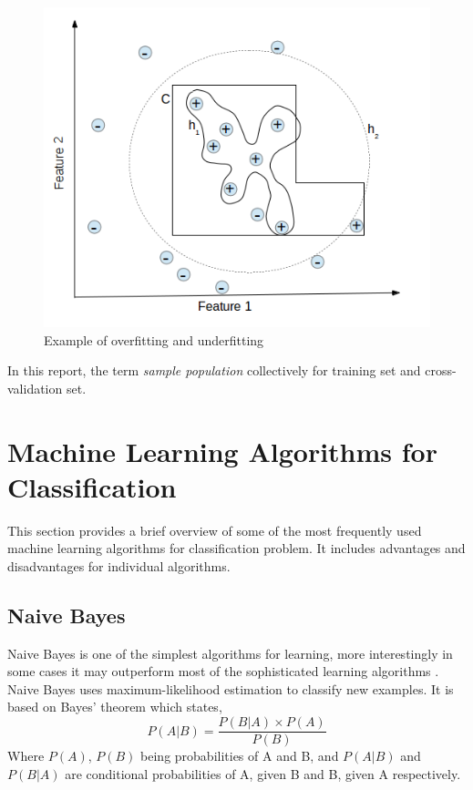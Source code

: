 \begin{figure}[h]
  \begin{center}
    \captionsetup{justification=centering}
    \includegraphics[scale=0.45]{figures/mlfitting.png}
    \caption{Example of overfitting and underfitting}
    \label{fig:mlfitting}
  \end{center}
\end{figure}
In this report, the term \emph{sample population} collectively for training set and cross-validation set.

\section{Machine Learning Algorithms for Classification}
\label{sec:c3mlclassification}
This section provides a brief overview of some of the most frequently used machine learning algorithms for classification problem. It includes advantages and disadvantages for individual algorithms.

\subsection{Naive Bayes}
Naive Bayes is one of the simplest algorithms for learning, more interestingly in some cases it may outperform most of the sophisticated learning algorithms \cite{John1995}. Naive Bayes uses maximum-likelihood estimation to classify new examples. It is based on Bayes' theorem which states,
\[ P(A|B) = \frac{P(B|A) \times P(A)}{P(B)} \]
Where $P(A)$, $P(B)$ being probabilities of A and B, and $P(A|B)$ and $P(B|A)$ are conditional probabilities of A, given B and B, given A respectively.
 
